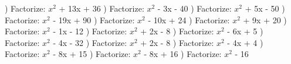 \documentclass{article}%
\begin{document}
) Factorize: $x^2$ + 13x + 36%
\newline%
\newline%
) Factorize: $x^2$ - 3x - 40%
\newline%
\newline%
) Factorize: $x^2$ + 5x - 50%
\newline%
\newline%
) Factorize: $x^2$ - 19x + 90%
\newline%
\newline%
) Factorize: $x^2$ - 10x + 24%
\newline%
\newline%
) Factorize: $x^2$ + 9x + 20%
\newline%
\newline%
) Factorize: $x^2$ - 1x - 12%
\newline%
\newline%
) Factorize: $x^2$ + 2x - 8%
\newline%
\newline%
) Factorize: $x^2$ - 6x + 5%
\newline%
\newline%
) Factorize: $x^2$ - 4x - 32%
\newline%
\newline%
) Factorize: $x^2$ + 2x - 8%
\newline%
\newline%
) Factorize: $x^2$ - 4x + 4%
\newline%
\newline%
) Factorize: $x^2$ - 8x + 15%
\newline%
\newline%
) Factorize: $x^2$ - 8x + 16%
\newline%
\newline%
) Factorize: $x^2$ - 16%
\end{document}
